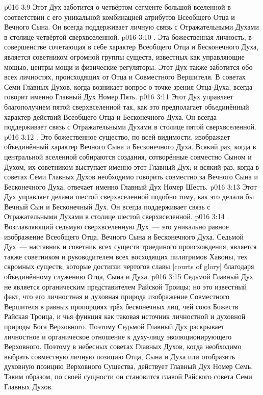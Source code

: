 \vs p016 3:9 Этот Дух заботится о четвёртом сегменте большой вселенной в соответствии с его уникальной комбинацией атрибутов Всеобщего Отца и Вечного Сына. Он всегда поддерживает личную связь с Отражательными Духами в столице четвёртой сверхвселенной.
\vs p016 3:10 \pc {}. Эта божественная личность, в совершенстве сочетающая в себе характер Всеобщего Отца и Бесконечного Духа, является советником огромной группы существ, известных как управляющие мощью, центры мощи и физические регуляторы. Этот Дух также заботится обо всех личностях, происходящих от Отца и Совместного Вершителя. В советах Семи Главных Духов, когда возникает вопрос о точке зрения Отца\hyp{}Духа, всегда говорит именно Главный Дух Номер Пять.
\vs p016 3:11 Этот Дух управляет благополучием пятой сверхвселенной так, как это предполагает объединённый характер действий Всеобщего Отца и Бесконечного Духа. Он всегда поддерживает связь с Отражательными Духами в столице пятой сверхвселенной.
\vs p016 3:12 \pc {}. Это божественное существо, по всей видимости, изображает объединённый характер Вечного Сына и Бесконечного Духа. Всякий раз, когда в центральной вселенной собираются создания, сотворённые совместно Сыном и Духом, их советником выступает именно этот Главный Дух; и всякий раз, когда в советах Семи Главных Духов необходимо говорить совместно за Вечного Сына и Бесконечного Духа, отвечает именно Главный Дух Номер Шесть.
\vs p016 3:13 Этот Дух управляет делами шестой сверхвселенной подобно тому, как это делали бы Вечный Сын и Бесконечный Дух. Он всегда поддерживает связь с Отражательными Духами в столице шестой сверхвселенной.
\vs p016 3:14 \pc {}. Возглавляющий седьмую сверхвселенную Дух~--- это уникально равное изображение Всеобщего Отца, Вечного Сына и Бесконечного Духа. Седьмой Дух~--- наставник и советник всех существ триединого происхождения, является также советником и руководителем всех восходящих пилигримов Хавоны, тех скромных существ, которые достигли чертогов славы [courts of glory] благодаря объединённому служению Отца, Сына и Духа.
\vs p016 3:15 Седьмой Главный Дух не является органическим представителем Райской Троицы; но это известный факт, что его личностная и духовная природа  изображение Совместного Вершителя в равных пропорциях трёх бесконечных лиц, чей союз Божеств  Райская Троица, и чья функция как таковая  источник личностной и духовной природы Бога Верховного. Поэтому Седьмой Главный Дух раскрывает личностное и органическое отношение к духу\hyp{}лицу эволюционирующего Верховного. Поэтому в небесных советах Главных Духов, когда необходимо выбрать совместную личную позицию Отца, Сына и Духа или отобразить духовную позицию Верховного Существа, действует Главный Дух Номер Семь. Таким образом, по своей сущности он становится главой Райского совета Семи Главных Духов.
